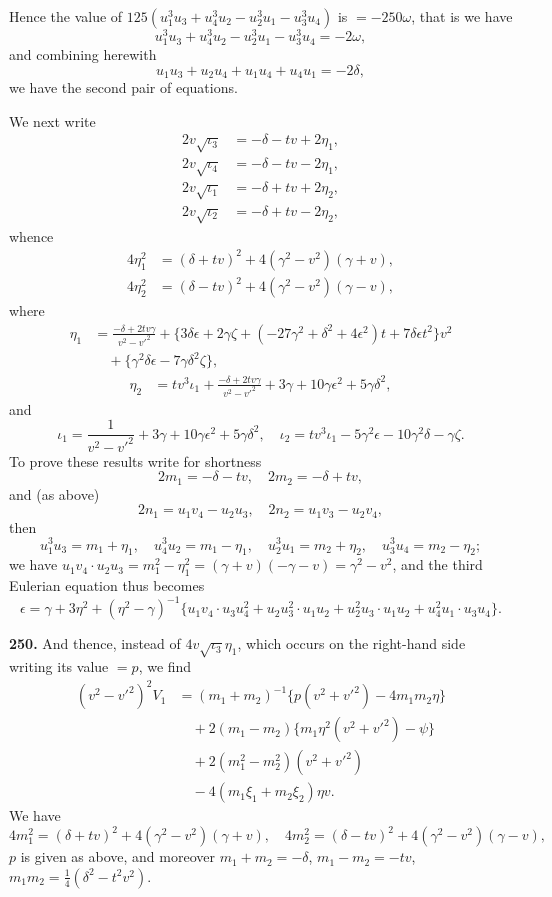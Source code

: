 \documentclass[11pt,a4paper]{book}
\begin{document}
Hence the value of $125(u_1^3u_3 + u_4^3u_2 - u_2^3u_1 - u_3^3u_4)$ is $= -250\omega$, that is we have
\[
u_1^3u_3 + u_4^3u_2 - u_2^3u_1 - u_3^3u_4 = -2\omega,\]
and combining herewith
\[
u_1u_3 + u_2u_4 + u_1u_4 + u_4u_1 = -2\delta,\]
we have the second pair of equations.

We next write
\begin{align*}
2v\sqrt{\iota_3} &= -\delta - tv + 2\eta_1,\\
2v\sqrt{\iota_4} &= -\delta - tv - 2\eta_1,\\
2v\sqrt{\iota_1} &= -\delta + tv + 2\eta_2,\\
2v\sqrt{\iota_2} &= -\delta + tv - 2\eta_2,
\end{align*}
whence
\begin{align*}
4\eta_1^2 &= (\delta + tv)^2 + 4(\gamma^2 - v^2)(\gamma + v),\\
4\eta_2^2 &= (\delta - tv)^2 + 4(\gamma^2 - v^2)(\gamma - v),
\end{align*}
where
\begin{align*}
\eta_1 &= \frac{-\delta + 2tv\gamma}{v^2 - v'^2} + \{3\delta\epsilon + 2\gamma\zeta + (-27\gamma^2 + \delta^2 + 4\epsilon^2)t + 7\delta\epsilon t^2\}v^2 \\
&\quad + \{\gamma^2\delta\epsilon - 7\gamma\delta^2\zeta\},
\end{align*}
\begin{align*}
\eta_2 &= tv^3\iota_1 + \frac{-\delta + 2tv\gamma}{v^2 - v'^2} + 3\gamma + 10\gamma\epsilon^2 + 5\gamma\delta^2,
\end{align*}
and
\[
\iota_1 = \frac{1}{v^2 - v'^2} + 3\gamma + 10\gamma\epsilon^2 + 5\gamma\delta^2,\quad
\iota_2 = tv^3\iota_1 - 5\gamma^2\epsilon - 10\gamma^2\delta - \gamma\zeta.
\]
To prove these results write for shortness
\[
2m_1 = -\delta - tv,\quad 2m_2 = -\delta + tv,
\]
and (as above)
\[
2n_1 = u_1v_4 - u_2u_3,\quad 2n_2 = u_1v_3 - u_2v_4,
\]
then
\[
u_1^3u_3 = m_1 + \eta_1,\quad u_4^3u_2 = m_1 - \eta_1,\quad u_2^3u_1 = m_2 + \eta_2,\quad u_3^3u_4 = m_2 - \eta_2;\]
we have $u_1v_4 \cdot u_2u_3 = m_1^2 - \eta_1^2 = (\gamma + v)(-\gamma - v) = \gamma^2 - v^2$, and the third Eulerian equation thus becomes
\[
\epsilon = \gamma + 3\eta^2 + (\eta^2 - \gamma)^{-1}\{u_1v_4 \cdot u_3u_4^2 + u_2u_3^2 \cdot u_1u_2 + u_2^2u_3 \cdot u_1u_2 + u_4^2u_1 \cdot u_3u_4\}.
\]

\vspace{0.5em}

\noindent\textbf{250.} And thence, instead of $4v\sqrt{\iota_3}\eta_1$, which occurs on the right-hand side writing its value $= p$, we find
\begin{align*}
(v^2 - v'^2)^2 V_1 &= (m_1 + m_2)^{-1}\{p(v^2 + v'^2) - 4m_1m_2\eta\} \\
&\quad + 2(m_1 - m_2)\{m_1\eta^2(v^2 + v'^2) - \psi\} \\
&\quad + 2(m_1^2 - m_2^2)(v^2 + v'^2) \\
&\quad - 4(m_1\xi_1 + m_2\xi_2)\eta v.
\end{align*}
We have
\[
4m_1^2 = (\delta + tv)^2 + 4(\gamma^2 - v^2)(\gamma + v),\quad 4m_2^2 = (\delta - tv)^2 + 4(\gamma^2 - v^2)(\gamma - v),
\]
$p$ is given as above, and moreover $m_1 + m_2 = -\delta$, $m_1 - m_2 = -tv$, $m_1m_2 = \frac{1}{4}(\delta^2 - t^2v^2)$.
\end{document}
